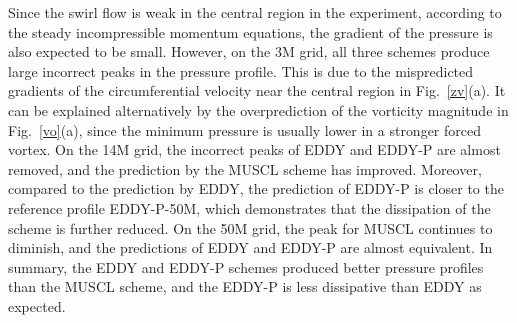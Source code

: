 Since the swirl flow is weak in the central region in the experiment, according to the steady incompressible momentum equations, the gradient of the pressure is also expected to be small. However, on the 3M grid, all three schemes produce large incorrect peaks in the pressure profile. This is due to the mispredicted gradients of the circumferential velocity near the central region in Fig.~\ref{zv}(a). It can be explained alternatively by the overprediction of the vorticity magnitude in Fig.~\ref{vo}(a), since the minimum pressure is usually lower in a stronger forced vortex. On the 14M grid, the incorrect peaks of EDDY and EDDY-P are almost removed, and the prediction by the MUSCL scheme has improved. Moreover, compared to the prediction by EDDY, the prediction of EDDY-P is closer to the reference profile EDDY-P-50M, which demonstrates that the dissipation of the scheme is further reduced. On the 50M grid, the peak for MUSCL continues to diminish, and the predictions of EDDY and EDDY-P are almost equivalent. In summary, the EDDY and EDDY-P schemes produced better pressure profiles than the MUSCL scheme, and the EDDY-P is less dissipative than EDDY as expected. 
